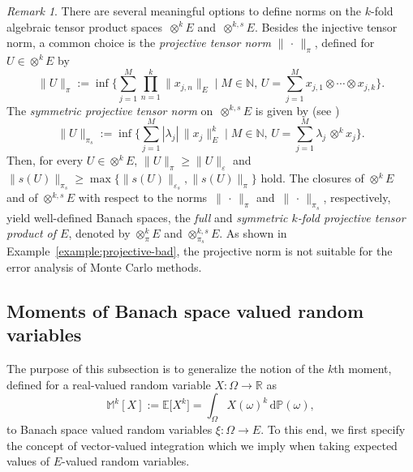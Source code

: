 \documentclass[reqno]{amsart}
\numberwithin{equation}{section}
\newcommand{\bbE}{\mathbb{E}}
\newcommand{\bbM}{\mathbb{M}}
\newcommand{\bbN}{\mathbb{N}}
\newcommand{\bbP}{\mathbb{P}}
\newcommand{\bbR}{\mathbb{R}}
\newcommand{\xk}{\otimes^k}
\newcommand{\xks}{\otimes^{k,s}}
\newcommand{\xkpi}{\otimes^k_\pi}
\newcommand{\xkspis}{\otimes^{k,s}_{\pi_s}}
\newcommand{\tenvec}{U}
\newcommand{\norm}[2]{     \| #1       \|_{ #2 }}
\newcommand{\rd}{\mathrm{d}}
\newcommand{\from}{\colon}
\newcommand{\eps}{\varepsilon}
\newcommand{\sym}{s}
\theoremstyle{remark}
\newtheorem{remark}[lemma]{Remark}
\theoremstyle{definition}
\begin{document}
\begin{remark}\label{rem:projective-norm} 
	There are several meaningful options to define norms  
	on the $k$-fold algebraic tensor product spaces~$\xk E$ 
	and~$\xks E$. 
	Besides the injective tensor norm, 
	a common choice is the 
	\emph{projective tensor norm} $\norm{\,\cdot\,}{\pi}$, 
	defined for $\tenvec \in \xk E$ by 
	\begin{equation}\label{eq:pinorm}
	\norm{\tenvec}{\pi} 
	:= 
	\inf\Biggl\{ 
	\sum_{j=1}^M \prod_{n=1}^k \norm{x_{j,n}}{E} 
	\; \Bigg| \;  
	M\in\bbN, \, 
	\tenvec = 
	\sum_{j=1}^{M} 
	x_{j,1} 
	\otimes 
	\cdots 
	\otimes 
	x_{j,k} 
	\Biggr\}. 
	\end{equation}
	The \emph{symmetric projective tensor norm} 
	on~$\xks E$ is given by 
	(see \cite[Section~2.2]{Floret1997}) 
	\begin{equation}\label{eq:spinorm}
	\norm{\tenvec}{\pi_s} 
	:= 
	\inf\Biggl\{ 
	\sum_{j=1}^M  
	|\lambda_j| \,
	\norm{x_j}{E}^k 
	\; \Bigg| \;  
	M\in\bbN, \, 
	\tenvec = 
	\sum_{j=1}^{M} 
	\lambda_j \, {\xk} x_j  
	\Biggr\}. 
	\end{equation}
	Then, for every $\tenvec\in \xk E$,  
	$\norm{\tenvec}{\pi}\geq \norm{\tenvec}{\eps}$ 
	and 
	$\norm{\sym(\tenvec)}{\pi_s} 
	\geq 
	\max\{ \norm{\sym(\tenvec)}{\eps_s}, \norm{\sym(\tenvec)}{\pi}\}$ hold. 
	The closures of $\xk E$ and of $\xks E$ 
	with respect to the norms~$\norm{\,\cdot\,}{\pi}$ 
	and~$\norm{\,\cdot\,}{\pi_s}$, respectively, 
	yield well-defined Banach spaces, 
	the \emph{full} and \emph{symmetric 
		$k$-fold projective tensor product of $E$}, 
	denoted by $\xkpi E$ and $\xkspis E$. 
	As shown in Example~\ref{example:projective-bad}, 
	the projective norm is not suitable 
	for the error analysis of Monte Carlo methods. 
\end{remark} 


\subsection{Moments of Banach space valued random variables} 
\label{subsec:moments} 

The purpose of this subsection is to generalize the notion 
of the $k$th moment, defined for a real-valued 
random variable $X\from\Omega\to\bbR$ as 
\[
\bbM^k[X] 
:= 
\bbE\bigl[ X^k \bigr] 
= 
\int_{\Omega} X(\omega)^k \, \rd\bbP(\omega), 
\]
to Banach space valued random variables 
$\xi\from\Omega\to E$. 
To this end, we first specify 
the concept of vector-valued integration 
which we imply when taking expected values 
of $E$-valued random variables. 
\end{document}
